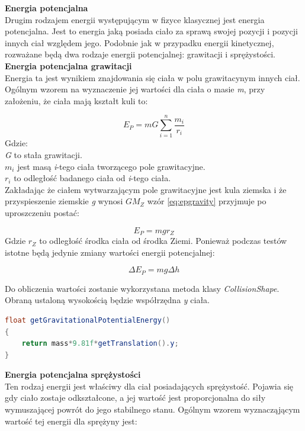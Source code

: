 \textbf{Energia potencjalna}\\
Drugim rodzajem energii występującym w fizyce klasycznej jest energia
potencjalna. Jest to energia jaką posiada ciało za sprawą swojej pozycji i
pozycji innych ciał względem jego. Podobnie jak w przypadku energii
kinetycznej, rozważane będą dwa rodzaje energii potencjalnej: grawitacji i
sprężystości.\\

\textbf{Energia potencjalna grawitacji}\\
Energia ta jest wynikiem znajdowania się ciała w polu grawitacynym innych ciał.
Ogólnym wzorem na wyznaczenie jej wartości dla ciała o masie \emph{m}, przy
założeniu, że ciała mają kształt kuli to:

\begin{equation}
E_{P} = mG\sum_{i=1}^{n}\frac{m_{i}}{r_{i}}
\label{eq:epgravity}
\end{equation}
Gdzie:\\
\emph{G} to stała grawitacji.\\
$ m_{i} $ jest masą \emph{i}-tego ciała tworzącego pole grawitacyjne.\\
$ r_{i} $ to odległość badanego ciała od \emph{i}-tego ciała.\\

Zakładając że ciałem wytwarzającym pole grawitacyjne jest kula ziemska i że
przyspieszenie ziemskie \emph{g} wynosi $ GM_{Z} $ wzór
\ref{eq:epgravity} przyjmuje po uproszczeniu postać:

\begin{equation}
E_{P} = mgr_{Z}
\end{equation}
Gdzie $ r_{Z} $ to odległość środka ciała od środka Ziemi. Ponieważ podczas
testów istotne będą jedynie zmiany wartości energii potencjalnej:

\begin{equation}
\Delta E_{P} = mg\Delta h
\end{equation}

Do obliczenia wartości zostanie wykorzystana metoda klasy \emph{CollisionShape}.
Obraną ustaloną wysokością będzie współrzędna \emph{y} ciała.

\begin{lstlisting}[language=Java,
caption=fragment pliku CollisionShape.java,label=lis:epgravity]
float getGravitationalPotentialEnergy()
{
	return mass*9.81f*getTranslation().y;
}
\end{lstlisting}

\textbf{Energia potencjalna sprężystości}\\
Ten rodzaj energii jest właściwy dla ciał posiadających sprężystość. Pojawia się
gdy ciało zostaje odkształcone, a jej wartość jest proporcjonalna do siły
wymuszającej powrót do jego stabilnego stanu. Ogólnym wzorem wyznacząjącym
wartość tej energii dla sprężyny jest:

